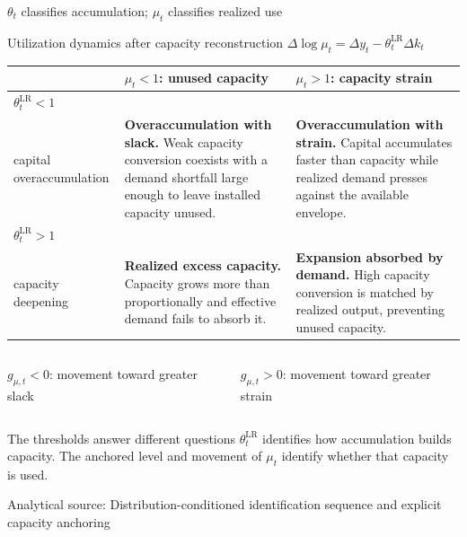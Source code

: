 \documentclass[10pt,aspectratio=169]{beamer}
\newcommand{\LR}{\mathrm{LR}}
\newcommand{\sourcefooter}[1]{%
  \par\vfill{\tiny\color{gray!70}Analytical source: #1}\vspace{-0.35em}}
\begin{document}
\begin{frame}{$\theta_t$ classifies accumulation; $\mu_t$ classifies realized use}
  \vspace{-0.25em}
  \begin{block}{Utilization dynamics after capacity reconstruction}
    \centering
    \Large $\Delta\log\mu_t=\Delta y_t-\theta_t^{\LR}\Delta k_t$
  \end{block}
  \scriptsize
  \renewcommand{\arraystretch}{1.45}
  \begin{tabular}{@{}L{0.18\textwidth}L{0.37\textwidth}L{0.37\textwidth}@{}}
    \toprule
    & \centering\arraybackslash $\mu_t<1$: unused capacity
    & \centering\arraybackslash $\mu_t>1$: capacity strain \\
    \midrule
    $\theta_t^{\LR}<1$\\capital overaccumulation
      & \textbf{Overaccumulation with slack.} Weak capacity conversion coexists with a demand shortfall large enough to leave installed capacity unused.
      & \textbf{Overaccumulation with strain.} Capital accumulates faster than capacity while realized demand presses against the available envelope. \\
    $\theta_t^{\LR}>1$\\capacity deepening
      & \textbf{Realized excess capacity.} Capacity grows more than proportionally and effective demand fails to absorb it.
      & \textbf{Expansion absorbed by demand.} High capacity conversion is matched by realized output, preventing unused capacity. \\
    \bottomrule
  \end{tabular}
  \vspace{0.35em}
  \begin{columns}[T,onlytextwidth]
    \begin{column}{0.49\textwidth}
      \centering $g_{\mu,t}<0$: movement toward greater slack
    \end{column}
    \begin{column}{0.49\textwidth}
      \centering $g_{\mu,t}>0$: movement toward greater strain
    \end{column}
  \end{columns}
  \begin{alertblock}{The thresholds answer different questions}
    $\theta_t^{\LR}$ identifies how accumulation builds capacity. The anchored level and movement of $\mu_t$ identify whether that capacity is used.
  \end{alertblock}
  \sourcefooter{Distribution-conditioned identification sequence and explicit capacity anchoring}
\end{frame}
\end{document}
